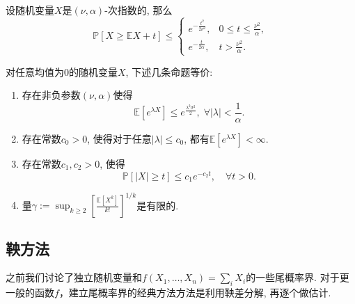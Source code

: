 \begin{theorem}[次指数随机变量的上偏差不等式]\label{thm:UpperDeviationOfSubExpRV}
	设随机变量$X$是$(\nu, \alpha)$-次指数的, 那么
	\begin{equation*}
		\mathbb{P}[X \geq \mathbb{E}X + t] \leq 
		\begin{cases}
			e^{-\frac{t^2}{2 \nu^2}}, & 0 \leq t \leq \frac{\nu^2}{\alpha}, \\
			e^{-\frac{t}{2 \alpha}}, & t > \frac{\nu^2}{\alpha}.
		\end{cases}
	\end{equation*}
\end{theorem}

\begin{theorem}[次高斯随机变量的等价定义]
	对任意均值为$0$的随机变量$X$, 下述几条命题等价: 
	\begin{enumerate}[label=(\Roman*)]
		\item 存在非负参数$(\nu, \alpha)$使得
			\begin{equation*}
				\mathbb{E}[e^{\lambda X} ] \leq e^{\frac{\lambda^2 \sigma^2}{2}},\; \forall |\lambda| < \frac{1}{\alpha}. 
			\end{equation*}
		\item 存在常数$c_0 > 0$, 使得对于任意$|\lambda| \leq c_0$, 都有$\mathbb{E}[e^{\lambda X}] < \infty$. 
		\item 存在常数$c_1, c_2 > 0$, 使得
			\begin{equation*}
				\mathbb{P}[|X| \geq t] \leq c_1 e^{-c_2 t},\quad \forall t > 0. 
			\end{equation*}
		\item 量$\displaystyle \gamma:= \sup_{k \geq 2} \left[ \frac{\mathbb{E}[X^k]}{k!} \right]^{1/k}$是有限的. 
	\end{enumerate}
\end{theorem}


\subsection{鞅方法}

之前我们讨论了独立随机变量和$f(X_1, \dots, X_n) = \sum_i X_i$的一些尾概率界. 
对于更一般的函数$f$，建立尾概率界的经典方法方法是利用鞅差分解, 再逐个做估计. 

